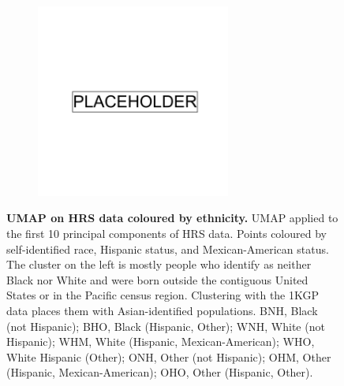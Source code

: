 \begin{figure}[ht]
    \centering
    \begin{subfigure}{0.95\textwidth}
    \includegraphics[width=0.7\textwidth]{placeholder.png}
    \end{subfigure}
    \caption[UMAP on HRS data coloured by ethnicity]{\textbf{UMAP on HRS data coloured by ethnicity.} UMAP applied to the first 10 principal components of HRS data. Points coloured by self-identified race, Hispanic status, and Mexican-American status. The cluster on the left is mostly people who identify as neither Black nor White and were born outside the contiguous United States or in the Pacific census region. Clustering with the 1KGP data places them with Asian-identified populations. BNH, Black (not Hispanic); BHO, Black (Hispanic, Other); WNH, White (not Hispanic); WHM, White (Hispanic, Mexican-American); WHO, White Hispanic (Other); ONH, Other (not Hispanic); OHM, Other (Hispanic, Mexican-American); OHO, Other (Hispanic, Other).}
    \label{fig:supp_umap_hrs_eth}
\end{figure}

\newpage

